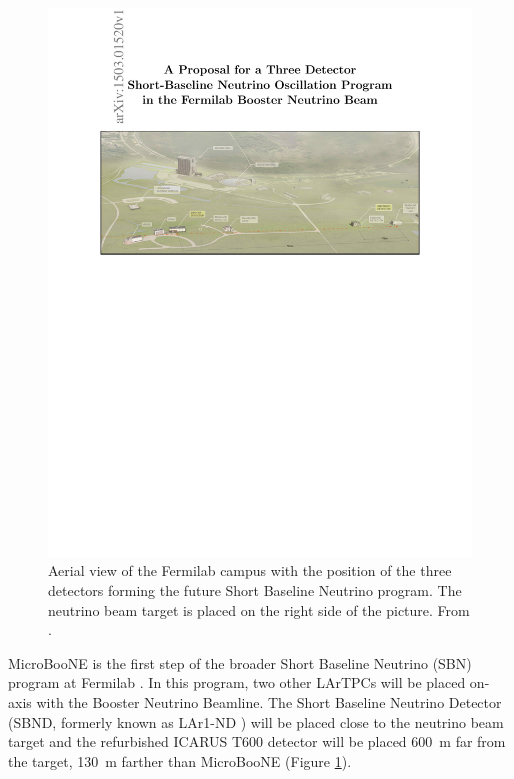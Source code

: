 \begin{figure}[htbp]
    \centering
    \includegraphics[width=0.98\linewidth]{figures/sbn_aerial.pdf}
    \caption{Aerial view of the Fermilab campus with the position of the three detectors forming the future Short Baseline Neutrino program. The neutrino beam target is placed on the right side of the picture. From \cite{Antonello:2015lea}.}
    \label{fig:sbn_aerial}
\end{figure}

MicroBooNE is the first step of the broader Short Baseline Neutrino (SBN) program at Fermilab \cite{Antonello:2015lea}. In this program, two other LArTPCs will be placed on-axis with the Booster Neutrino Beamline. The Short Baseline Neutrino Detector (SBND, formerly known as LAr1-ND \cite{Adams:2013uaa}) will be placed close to the neutrino beam target and the refurbished ICARUS T600 detector \cite{Varanini:2017pvw} will be placed 600~m far from the target, 130~m farther than MicroBooNE (Figure \ref{fig:sbn_aerial}).

